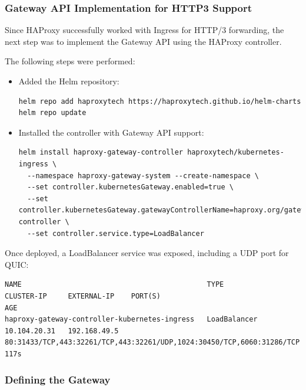 \subsubsection{Gateway API Implementation for HTTP3 Support}

Since HAProxy successfully worked with Ingress for HTTP/3 forwarding, the next step was to implement the Gateway API using the HAProxy controller.


The following steps were performed:

\begin{itemize}
  \item Added the Helm repository:
\begin{lstlisting}[breaklines=true,basicstyle=\small\ttfamily,frame=single]
helm repo add haproxytech https://haproxytech.github.io/helm-charts
helm repo update
\end{lstlisting}

  \item Installed the controller with Gateway API support:
\begin{lstlisting}[breaklines=true,basicstyle=\small\ttfamily,frame=single]
helm install haproxy-gateway-controller haproxytech/kubernetes-ingress \
  --namespace haproxy-gateway-system --create-namespace \
  --set controller.kubernetesGateway.enabled=true \
  --set controller.kubernetesGateway.gatewayControllerName=haproxy.org/gateway-controller \
  --set controller.service.type=LoadBalancer
\end{lstlisting}
\end{itemize}

Once deployed, a LoadBalancer service was exposed, including a UDP port for QUIC:

\begin{lstlisting}[breaklines=true,basicstyle=\small\ttfamily,frame=single]
NAME                                            TYPE           CLUSTER-IP     EXTERNAL-IP    PORT(S)                                                                  AGE
haproxy-gateway-controller-kubernetes-ingress   LoadBalancer   10.104.20.31   192.168.49.5   80:31433/TCP,443:32261/TCP,443:32261/UDP,1024:30450/TCP,6060:31286/TCP   117s
\end{lstlisting}

\subsubsection{Defining the Gateway}

